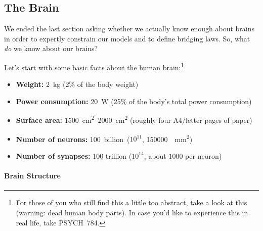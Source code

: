 \documentclass[10pt,letterpaper,oneside]{article}
\begin{document}


\subsection{The Brain}

We ended the last section asking whether we actually know enough about brains in order to expertly constrain our models and to define bridging laws. So, what \emph{do} we know about our brains?

Let's start with some basic facts about the human brain:\footnote{For those of you who still find this a little too abstract, take a look at this  (warning: dead human body parts). In case you'd like to experience this in real life, take PSYCH~784.}
\begin{itemize}
	\item \textbf{Weight:} \SI{2}{\kilogram} (2\% of the body weight)
	\item \textbf{Power consumption:} \SI{20}{\watt} (25\% of the body's total power consumption)
	\item \textbf{Surface area:} \SIrange{1500}{2000}{\centi\metre\squared} (roughly four A4/letter pages of paper)
	\item \textbf{Number of neurons:} \SI{100} billion ($10^{11}$, \SI{150000}{\per\milli\metre\squared})
	\item \textbf{Number of synapses:} 100 trillion ($10^{14}$, about $1000$ per neuron)
\end{itemize}


\paragraph{Brain Structure}
\end{document}

